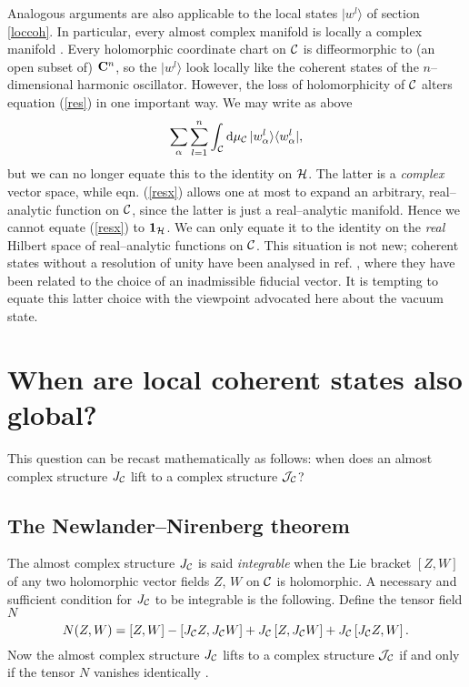 \documentclass[a4paper,a4paper]{article}
\begin{document}
Analogous arguments are also applicable to the local states $|w^l\rangle$ 
of section \ref{loccoh}. 
In particular, every almost complex manifold is locally a complex manifold \cite{KN}.
Every holomorphic coordinate chart on ${\cal C}$ is  diffeormorphic to (an open 
subset of) ${\bf C}^n$, so the $|w^l\rangle$ look locally like the coherent 
states of the $n$--dimensional harmonic oscillator.
However, the loss of holomorphicity of ${\cal C}$ 
alters equation (\ref{res}) in one important way. We may write as above
\begin{equation}
\sum_{\alpha}\sum_{l=1}^n\int_{\cal C} {\rm d}\mu_{\cal C}\, |w^l_{\alpha}\rangle  \langle 
w^l_{\alpha}|,
\label{resx}
\end{equation}
but we can no longer equate this to the identity on 
${\cal H}$. The latter is a {\it complex}\/ vector space, while eqn.
(\ref{resx}) allows one at most to expand an arbitrary,
real--analytic function on ${\cal C}$, since the latter is just a 
real--analytic manifold. Hence we cannot equate (\ref{resx})
to ${\bf 1}_{\cal H}$. We can only equate it to the identity on the {\it 
real}\/
Hilbert space of real--analytic functions on ${\cal C}$.
This situation is not new; coherent states without a resolution of unity have been 
analysed in ref. \cite{NOUNITY}, where they have been related to the choice of 
an inadmissible fiducial vector. It is tempting to equate this latter 
choice with the viewpoint advocated here about the vacuum state. 

\section{When are local coherent states also global?}\label{when}

This question can be recast mathematically as follows: when does an almost 
complex structure $J_{\cal C}$ lift to a complex structure ${\cal J}_{\cal C}$? 

\subsection{The Newlander--Nirenberg theorem}\label{nnt}

The almost complex structure $J_{\cal C}$ is said {\it integrable} 
when the Lie bracket $[Z, W]$ of any two holomorphic vector fields $Z$, $W$ 
on ${\cal C}$ is holomorphic. A necessary and sufficient condition for 
$J_{\cal C}$ 
to be integrable is the following. Define the tensor field $N$
\begin{equation}
N(Z,W)=\left[Z,W\right] - \left[J_{\cal C}Z,J_{\cal C}W\right] 
+J_{\cal C}\left[Z, J_{\cal C}W\right] + J_{\cal C}\left[J_{\cal C}Z, W\right].
\label{tors}
\end{equation}
Now the almost complex structure $J_{\cal C}$ lifts to a complex structure 
${\cal J}_{\cal C}$ if and only if the tensor $N$ vanishes identically 
\cite{NN}.
\end{document}
